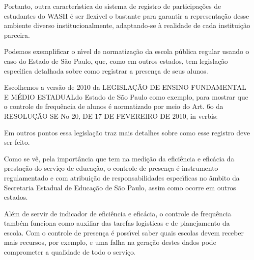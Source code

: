 \documentclass[
12pt,		%
openright,	%
twoside,  %
a4paper,			%
chapter=TITLE,		%
english,			%
french,				%
spanish,			%
brazil				%
]{USPSC-classe/USPSC}
\begin{document}
Portanto, outra caracter\'{\i}stica do sistema de registro de participa\c{c}\~oes de estudantes do WASH \'e ser flex\'{\i}vel o bastante para garantir a representa\c{c}\~ao desse ambiente diverso institucionalmente, adaptando-se \`a realidade de cada institui\c{c}\~ao parceira.




Podemos exemplificar o n\'{\i}vel de normatiza\c{c}\~ao da escola p\'ublica regular usando o caso do Estado de S\~ao Paulo, que, como em outros estados, tem legisla\c{c}\~ao espec\'{\i}fica detalhada sobre como registrar a presen\c{c}a de seus alunos.




Escolhemos a vers\~ao de 2010 da \textquotedbl LEGISLA\c{C}\~AO DE ENSINO FUNDAMENTAL E M\'EDIO ESTADUAL\textquotedbl  do Estado de S\~ao Paulo como exemplo, para mostrar que o controle de frequ\^encia de alunos \'e normatizado por meio do Art. 6o da RESOLU\c{C}\~AO SE No 20, DE 17 DE FEVEREIRO DE 2010, in verbis:





\noindent\begin{center}\mbox{\centering{}}\end{center}


Em outros pontos essa legisla\c{c}\~ao traz mais detalhes sobre como esse registro deve ser feito.




Como se v\^e, pela import\^ancia que tem na medi\c{c}\~ao da efici\^encia e efic\'acia da presta\c{c}\~ao do servi\c{c}o de educa\c{c}\~ao, o controle de presen\c{c}a \'e instrumento regulamentado e com atribui\c{c}\~ao de responsabilidades espec\'{\i}ficas no \^ambito da Secretaria Estadual de Educa\c{c}\~ao de S\~ao Paulo, assim como ocorre em outros estados.




Al\'em de servir de indicador de efici\^encia e efic\'acia, o controle de frequ\^encia tamb\'em funciona como auxiliar das tarefas log\'{\i}sticas e de planejamento da escola. Com o controle de presen\c{c}a \'e poss\'{\i}vel saber quais escolas devem receber mais recursos, por exemplo, e uma falha na gera\c{c}\~ao destes dados pode comprometer a qualidade de todo o servi\c{c}o.
\end{document}
